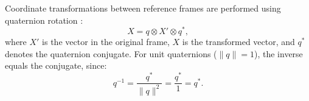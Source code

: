 Coordinate transformations between reference frames are performed using quaternion rotation \cite{guerrero2017quadrotor}:
\begin{equation}
X = q \otimes X' \otimes q^*,
\label{eqn:quaternion_rotation}
\end{equation}
where $X'$ is the vector in the original frame, $X$ is the transformed vector, and $q^*$ denotes the quaternion conjugate. For unit quaternions ($\|q\| = 1$), the inverse equals the conjugate, since:
\begin{equation}
q^{-1} = \frac{q^*}{\|q\|^2} = \frac{q^*}{1} = q^*.
\label{eqn:quaternion_inverse}
\end{equation}






